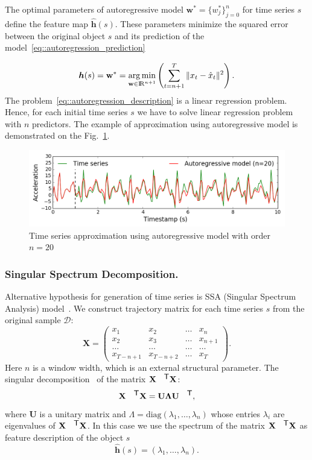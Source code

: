 \documentclass{llncs}
\DeclareMathOperator*{\argmin}{arg\,min}
\newcommand{\T}{{\mbox{\footnotesize\sffamily\upshape\mdseries T}}}
\begin{document}
The optimal parameters of autoregressive model $\mathbf{w}^* = \{w^*_j\}_{j=0}^n$ for time series $s$ define the feature map $\hat{\bm{h}}(s)$.
These parameters minimize the squared error between the original object $s$ and its prediction of the model~\eqref{eq::autoregression_prediction}

\begin{equation}
\bm{h}(s) = \mathbf{w}^* = \argmin_{\mathbf{w} \in \bbbr^{n+1}} \left( \sum_{t=n+1}^{T} \|x_t - \hat{x}_t\|^2\right).
\label{eq::autoregression_description}
\end{equation}
The problem~\eqref{eq::autoregression_description} is a linear regression problem. Hence, for each initial time series $s$ we have to solve linear regression problem with $n$ predictors.
The example of approximation using autoregressive model is demonstrated on the Fig.~\ref{fig::ar_example}.

\begin{figure}[h]
	\centering
	\includegraphics[width=1\linewidth]{pics/ar_example.png}
	\caption{Time series approximation using autoregressive model with order $n = 20$}
	\label{fig::ar_example}
\end{figure}

\subsubsection{Singular Spectrum Decomposition.}
Alternative hypothesis for generation of time series is SSA (Singular Spectrum Analysis) model~\cite{hassani2007singular}. We construct trajectory matrix for each time series $s$ from the original sample $\mathcal{D}$:
\[
\mathbf{X} = 
\begin{pmatrix}
x_1 & x_2 & \dots & x_n \\
x_2 & x_3 & \dots & x_{n+1} \\
\dots & \dots & \dots & \dots \\
x_{T-n+1} & x_{T-n+2} & \dots & x_T
\end{pmatrix}.
\]
Here $n$ is a window width, which is an external structural parameter.
The singular decomposition~\cite{golub1970singular} of the matrix $\mathbf{X}^{\T} \mathbf{X}$:
\[
\mathbf{X}^{\T} \mathbf{X} = \mathbf{U} \mathbf{\Lambda} \mathbf{U}^{\T},
\]
where $\mathbf{U}$ is a unitary matrix and $\Lambda = \mathrm{diag}(\lambda_1, \dots, \lambda_n)$ whose entries $\lambda_i$ are eigenvalues of $\mathbf{X}^{\T} \mathbf{X}$. In this case we use the spectrum of the matrix $\mathbf{X}^{\T} \mathbf{X}$ as feature description of the object $s$
\[
\hat{\bm{h}}(s) = (\lambda_1, \dots, \lambda_n).
\]
\end{document}
